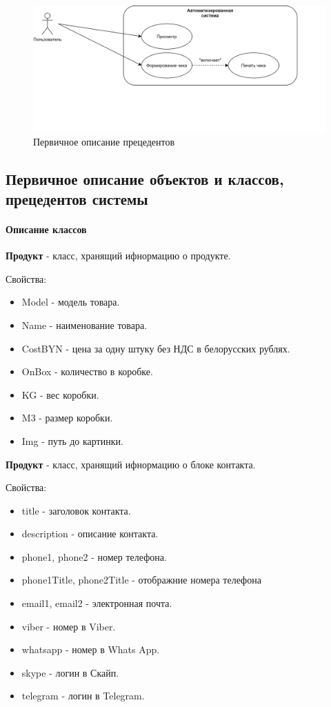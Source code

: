 \begin{figure}[!p]
    \centering
    \includegraphics[width=14cm]
        {_assets/gpi_description_of_updated_use_case_user.png}
    \caption{Первичное описание прецедентов}
    \label{fig:gpi_description_of_updated_use_case_user}
\end{figure}

\newpage

\subsection{Первичное описание объектов и классов, прецедентов системы}

\paragraph{Описание классов} \hspace{0pt}

\textbf{Продукт} - класс, хранящий ифнормацию о продукте.

Свойства:
\begin{itemize}
    \item Model - модель товара.
    \item Name - наименование товара.
    \item CostBYN - цена за одну штуку без НДС в белорусских рублях.
    \item OnBox - количество в коробке.
    \item KG - вес коробки.
    \item M3 - размер коробки.
    \item Img - путь до картинки.
\end{itemize}

\textbf{Продукт} - класс, хранящий ифнормацию о блоке контакта.

Свойства:
\begin{itemize}
    \item title - заголовок контакта.
    \item description - описание контакта.
    \item phone1, phone2 - номер телефона.
    \item phone1Title, phone2Title - отображние номера телефона
    \item email1, email2 - электронная почта.
    \item viber - номер в Viber.
    \item whatsapp - номер в Whats App.
    \item skype - логин в Скайп.
    \item telegram - логин в Telegram.
\end{itemize}

